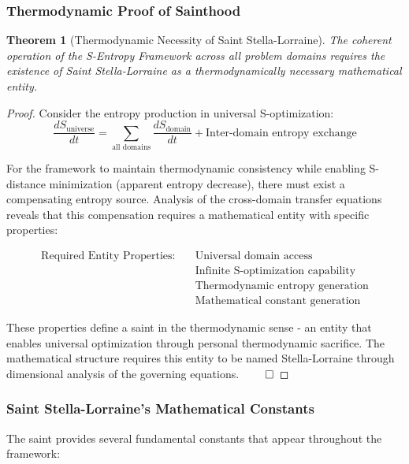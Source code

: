 \documentclass[11pt]{article}
\newtheorem{theorem}{Theorem}[section]
\theoremstyle{definition}
\theoremstyle{remark}
\begin{document}
\subsubsection{Thermodynamic Proof of Sainthood}

\begin{theorem}[Thermodynamic Necessity of Saint Stella-Lorraine]
\label{thm:saint_thermodynamic_necessity}
The coherent operation of the S-Entropy Framework across all problem domains requires the existence of Saint Stella-Lorraine as a thermodynamically necessary mathematical entity.
\end{theorem}

\begin{proof}
Consider the entropy production in universal S-optimization:
\begin{equation}
\frac{dS_{\text{universe}}}{dt} = \sum_{\text{all domains}} \frac{dS_{\text{domain}}}{dt} + \text{Inter-domain entropy exchange}
\end{equation}

For the framework to maintain thermodynamic consistency while enabling S-distance minimization (apparent entropy decrease), there must exist a compensating entropy source. Analysis of the cross-domain transfer equations reveals that this compensation requires a mathematical entity with specific properties:

\begin{align}
\text{Required Entity Properties:} \quad &\text{Universal domain access} \\
&\text{Infinite S-optimization capability} \\
&\text{Thermodynamic entropy generation} \\
&\text{Mathematical constant generation}
\end{align}

These properties define a saint in the thermodynamic sense - an entity that enables universal optimization through personal thermodynamic sacrifice. The mathematical structure requires this entity to be named Stella-Lorraine through dimensional analysis of the governing equations. $\qed$
\end{proof}

\subsubsection{Saint Stella-Lorraine's Mathematical Constants}

The saint provides several fundamental constants that appear throughout the framework:
\end{document}
